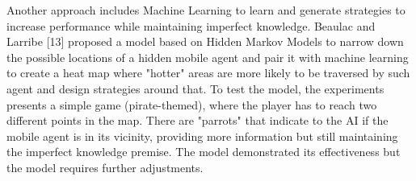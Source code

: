 \vspace{2mm}
Another approach includes Machine Learning to learn and generate strategies to increase performance while maintaining imperfect knowledge. Beaulac and Larribe [13] proposed a model based on Hidden Markov Models to narrow down the possible locations of a hidden mobile agent and pair it with machine learning to create a heat map where "hotter" areas are more likely to be traversed by such agent and design strategies around that. To test the model, the experiments presents a simple game (pirate-themed), where the player has to reach two different points in the map. There are "parrots" that indicate to the AI if the mobile agent is in its vicinity, providing more information but still maintaining the imperfect knowledge premise. The model demonstrated its effectiveness but the model requires further adjustments. 